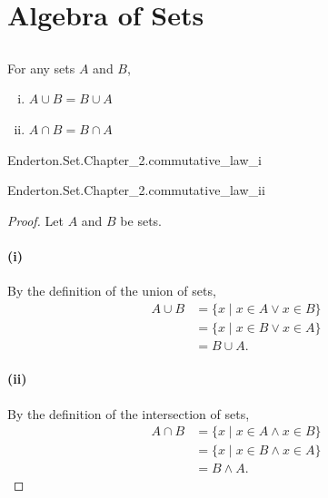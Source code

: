 \documentclass{report}
\begin{document}
\section{Algebra of Sets}%

\subsection{}%

  For any sets $A$ and $B$,
    \begin{enumerate}[(i)]
      \item $A \cup B = B \cup A$
      \item $A \cap B = B \cap A$
    \end{enumerate}

    {Enderton.Set.Chapter\_2.commutative\_law\_i}


    {Enderton.Set.Chapter\_2.commutative\_law\_ii}


  \begin{proof}

    Let $A$ and $B$ be sets.

    \paragraph{(i)}%

      By the definition of the union of sets,
        \begin{align*}
          A \cup B
            & = \{ x \mid x \in A \lor x \in B \} \\
            & = \{ x \mid x \in B \lor x \in A \} \\
            & = B \cup A.
        \end{align*}

    \paragraph{(ii)}%

      By the definition of the intersection of sets,
        \begin{align*}
          A \cap B
            & = \{ x \mid x \in A \land x \in B \} \\
            & = \{ x \mid x \in B \land x \in A \} \\
            & = B \land A.
        \end{align*}

  \end{proof}
\end{document}
